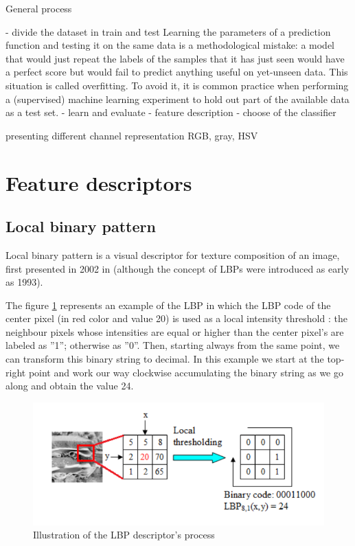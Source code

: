 General process

- divide the dataset in train and test
Learning the parameters of a prediction function and testing it on the same data is a methodological mistake: a model that would just repeat the labels of the samples that it has just seen would have a perfect score but would fail to predict anything useful on yet-unseen data. This situation is called overfitting. To avoid it, it is common practice when performing a (supervised) machine learning experiment to hold out part of the available data as a test set.
- learn and evaluate
- feature description
- choose of the classifier

presenting different channel representation
RGB, gray, HSV

\section{Feature descriptors}

\subsection{Local binary pattern}


Local binary pattern is a visual descriptor for texture composition of an image, first presented in 2002 in \cite{Ojala2002} (although the concept of LBPs were introduced as early as 1993).

The figure \ref{fig:lbp_process} represents an example of the LBP in which the LBP code of the center pixel (in red color and value 20) is used as a local intensity threshold : the neighbour pixels whose intensities are equal or higher than the center pixel’s are labeled as ”1”; otherwise as ”0”. Then, starting always from the same point, we can transform this binary string to decimal. In this example we start at the top-right point and work our way clockwise accumulating the binary string as we go along and obtain the value 24.

\begin{figure}[h]
    \includegraphics[scale=0.55]{img/lbp}
    \caption{Illustration of the LBP descriptor's process}
    \label{fig:lbp_process}
\end{figure}

